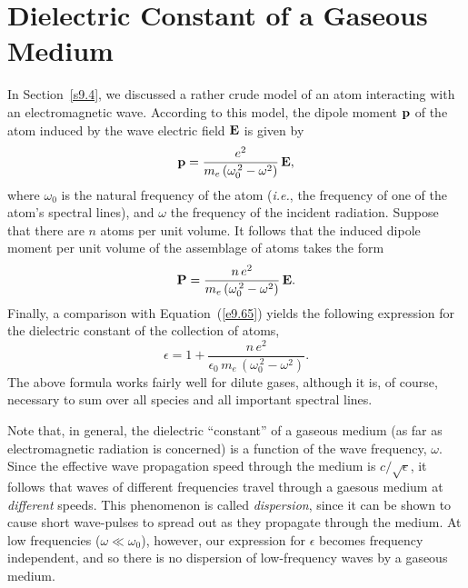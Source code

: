 \section{Dielectric Constant of a Gaseous Medium}\label{s9.6}
In Section~\ref{s9.4}, we discussed a rather crude model of an atom interacting with an electromagnetic wave. According to
this model, the dipole moment ${\bf p}$ of the atom induced by the wave electric field ${\bf E}$ is given by
\begin{equation}
{\bf p} = \frac{e^2}{m_e\,(\omega_0^{\,2}-\omega^2)}\,{\bf E},
\end{equation}
where $\omega_0$ is the natural frequency of the atom ({\em i.e.},
the frequency of one of the atom's spectral lines), and $\omega$
 the frequency of the incident radiation. Suppose that there
are $n$ atoms per unit volume. It follows that the induced dipole
moment per unit volume of the assemblage of atoms takes the
form
\begin{equation}
{\bf P} = \frac{n\,e^2}{m_e\,(\omega_0^{\,2}-\omega^2)}\,{\bf E}.
\end{equation}
Finally, a comparison with Equation~(\ref{e9.65}) yields the following expression
for the dielectric constant of the collection of atoms,
\begin{equation}\label{e9.75}
\epsilon = 1 + \frac{n\,e^2}{\epsilon_0\,m_e\,(\omega_0^{\,2}-\omega^2)}.
\end{equation}
The above formula works fairly well for dilute gases, although it is,
of course, necessary to sum over all species and all important
spectral lines. 

Note that, in general, the dielectric ``constant'' of a gaseous medium
(as far as electromagnetic radiation is concerned)
is a function of the wave frequency, $\omega$. Since the effective wave
propagation speed through the medium is $c/\sqrt{\epsilon}$, it follows that
waves of different frequencies travel through
a gaesous medium at {\em different}\/ speeds. This phenomenon
is called {\em dispersion}, since it can be shown to cause short
wave-pulses to spread out as they propagate through the medium.
At low frequencies ($\omega\ll \omega_0$), however, our
expression for $\epsilon$ becomes frequency independent, and so there
is no dispersion of low-frequency waves by a gaseous medium.

